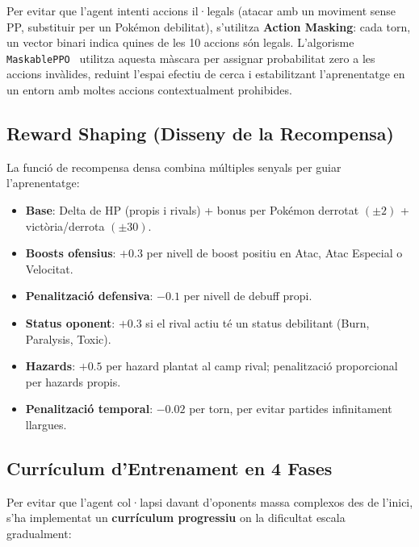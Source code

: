 Per evitar que l'agent intenti accions il·legals (atacar amb un moviment sense PP, substituir per un Pokémon debilitat), s'utilitza \textbf{Action Masking}: cada torn, un vector binari indica quines de les 10 accions són legals. L'algorisme \texttt{MaskablePPO}~\cite{sb3_contrib} utilitza aquesta màscara per assignar probabilitat zero a les accions invàlides, reduint l'espai efectiu de cerca i estabilitzant l'aprenentatge en un entorn amb moltes accions contextualment prohibides.

\subsection{Reward Shaping (Disseny de la Recompensa)}
\label{subsec:reward}

La funció de recompensa densa combina múltiples senyals per guiar l'aprenentatge:

\begin{itemize}
    \item \textbf{Base}: Delta de HP (propis i rivals) + bonus per Pokémon derrotat $(\pm 2)$ + victòria/derrota $(\pm 30)$.
    \item \textbf{Boosts ofensius}: $+0.3$ per nivell de boost positiu en Atac, Atac Especial o Velocitat.
    \item \textbf{Penalització defensiva}: $-0.1$ per nivell de debuff propi.
    \item \textbf{Status oponent}: $+0.3$ si el rival actiu té un status debilitant (Burn, Paralysis, Toxic).
    \item \textbf{Hazards}: $+0.5$ per hazard plantat al camp rival; penalització proporcional per hazards propis.
    \item \textbf{Penalització temporal}: $-0.02$ per torn, per evitar partides infinitament llargues.
\end{itemize}

\subsection{Currículum d'Entrenament en 4 Fases}

Per evitar que l'agent col·lapsi davant d'oponents massa complexos des de l'inici, s'ha implementat un \textbf{currículum progressiu} on la dificultat escala gradualment:

